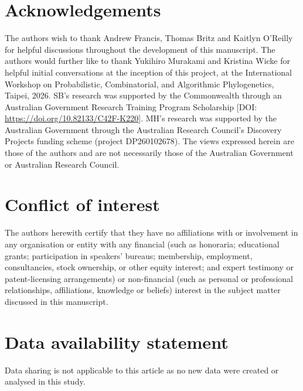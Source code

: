 \documentclass[12pt]{article}
\theoremstyle{definition}
\begin{document}
\section*{Acknowledgements} 
The authors wish to thank Andrew Francis, Thomas Britz and Kaitlyn O'Reilly for helpful discussions throughout the development of this manuscript. The authors would further like to thank Yukihiro Murakami and Kristina Wicke for helpful initial conversations at the inception of this project, 
at the International Workshop on Probabilistic, Combinatorial, and Algorithmic Phylogenetics, Taipei, 2026. SB's research was supported by the Commonwealth through an Australian Government Research Training Program Scholarship [DOI: \url{https://doi.org/10.82133/C42F-K220}]. MH's research was supported by the Australian Government through the Australian Research Council's Discovery Projects funding scheme (project DP260102678). The views expressed herein are those of the authors and are not necessarily those of the Australian Government or Australian Research Council.

\section*{Conflict of interest} The authors herewith certify that they have no affiliations with or involvement in any
organisation or entity with any financial (such as honoraria; educational grants; participation in speakers’ bureaus;
membership, employment, consultancies, stock ownership, or other equity interest; and expert testimony or patent-licensing
arrangements) or non-financial (such as personal or professional relationships, affiliations, knowledge or beliefs) interest in the subject matter discussed in this manuscript.

\section*{Data availability statement} 
Data sharing is not applicable to this article as no new data were created or analysed in this study.




\end{document}
